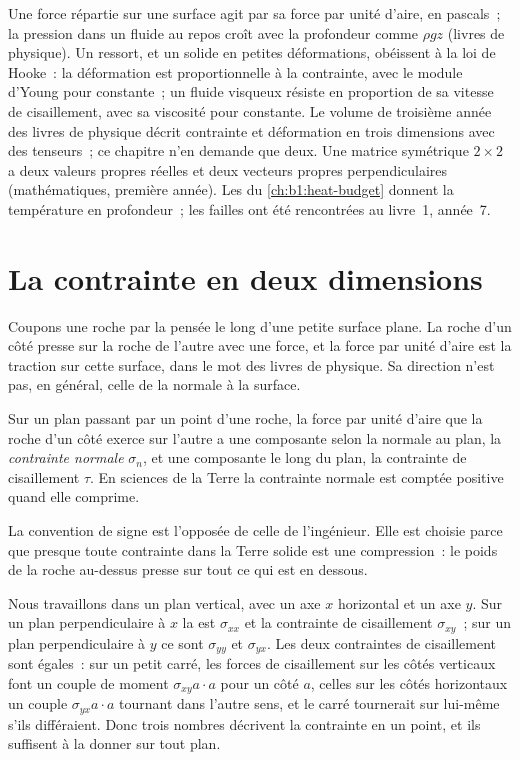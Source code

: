 \begin{recall}
Une force répartie sur une surface agit par sa force par unité d'aire, en pascals~;
la pression dans un fluide au repos croît avec la profondeur comme $\rho g z$ (livres de physique).
Un ressort, et un solide en petites déformations, obéissent à la loi de Hooke~: la déformation est
proportionnelle à la contrainte, avec le module d'Young pour constante~; un fluide
visqueux résiste en proportion de sa vitesse de cisaillement, avec sa viscosité pour
constante. Le volume de troisième année des livres de physique décrit contrainte et
déformation en trois dimensions avec des tenseurs~; ce chapitre n'en demande que deux. Une
matrice symétrique $2\times2$ a deux valeurs propres réelles et deux vecteurs propres
perpendiculaires (mathématiques, première année). Les  du
\cref{ch:b1:heat-budget} donnent la température en profondeur~; les failles ont été rencontrées au
livre~1, année~7.
\end{recall}

\section{La contrainte en deux dimensions}\label{sec:b1:stress-strain-rheology:stress}

Coupons une roche par la pensée le long d'une petite surface plane. La roche d'un côté presse
sur la roche de l'autre avec une force, et la force par unité d'aire est la
traction sur cette surface, dans le mot des livres de physique. Sa direction n'est pas, en
général, celle de la normale à la surface.

\begin{definition}\label{def:b1:stress-strain-rheology:stress}
Sur un plan passant par un point d'une roche, la force par unité d'aire que la roche d'un
côté exerce sur l'autre a une composante selon la normale au plan,
la \emph{contrainte normale} $\sigma_n$, et une composante
le long du plan, la contrainte de cisaillement $\tau$. En sciences de la Terre la contrainte
normale est comptée positive quand elle comprime.
\end{definition}

La convention de signe est l'opposée de celle de l'ingénieur. Elle est choisie parce que
presque toute contrainte dans la Terre solide est une compression~: le poids de la
roche au-dessus presse sur tout ce qui est en dessous.

Nous travaillons dans un plan vertical, avec un axe $x$ horizontal et un axe $y$. Sur un
plan perpendiculaire à $x$ la  est $\sigma_{xx}$ et la contrainte de
cisaillement $\sigma_{xy}$~; sur un plan perpendiculaire à $y$ ce sont $\sigma_{yy}$
et $\sigma_{yx}$. Les deux contraintes de cisaillement sont égales~: sur un petit carré, les
forces de cisaillement sur les côtés verticaux font un couple de moment
$\sigma_{xy}a\cdot a$ pour un côté $a$, celles sur les côtés horizontaux un couple
$\sigma_{yx}a\cdot a$ tournant dans l'autre sens, et le carré tournerait sur lui-même s'ils
différaient. Donc trois nombres décrivent la contrainte en un point, et ils
suffisent à la donner sur tout plan.

